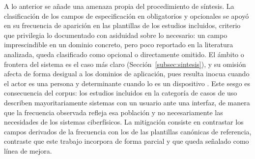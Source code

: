 
    A lo anterior se añade una amenaza propia del procedimiento de síntesis. La clasificación de los campos de especificación en obligatorios y opcionales se apoyó en su frecuencia de aparición en las plantillas de los estudios incluidos, criterio que privilegia lo documentado con asiduidad sobre lo necesario: un campo imprescindible en un dominio concreto, pero poco reportado en la literatura analizada, queda clasificado como opcional o directamente omitido. El ámbito o frontera del sistema es el caso más claro (Sección~\ref{subsec:sintesis}), y su omisión afecta de forma desigual a los dominios de aplicación, pues resulta inocua cuando el actor es una persona y determinante cuando lo es un dispositivo \cite{cockburn2001usecases,daun2023context}. Este sesgo es consecuencia del corpus: los estudios incluidos en la categoría de casos de uso describen mayoritariamente sistemas con un usuario ante una interfaz, de manera que la frecuencia observada refleja esa población y no necesariamente las necesidades de los sistemas ciberfísicos. La mitigación consiste en contrastar los campos derivados de la frecuencia con los de las plantillas canónicas de referencia, contraste que este trabajo incorpora de forma parcial y que queda señalado como línea de mejora.



